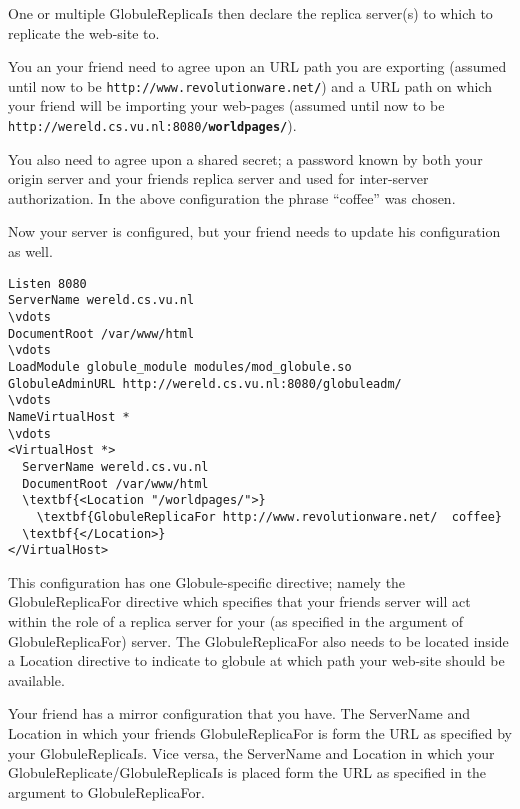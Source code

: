 \documentclass[10pt,a4paper]{article}
\makeatletter
\newenvironment{p}{\@open{P}{}}{\@close{P}}
\newenvironment{p}{}{\par}
\makeatother
\begin{document}
\begin{p}
One or multiple GlobuleReplicaIs then declare the replica server(s) to which
to replicate the web-site to.
\end{p}

\begin{p}
You an your friend need to agree upon an URL path you are exporting (assumed
until now to be \texttt{http://www.revolutionware.net\textbf{/}}) and a URL
path on which your friend will be importing your web-pages (assumed until now
to be \texttt{http://wereld.cs.vu.nl:8080/\textbf{worldpages/}}).
\end{p}

\begin{p}
You also need to agree upon a shared secret; a password known by both your
origin server and your friends replica server and used for inter-server
authorization.  In the above configuration the phrase ``coffee'' was chosen.
\end{p}

\begin{p}
Now your server is configured, but your friend needs to update his
configuration as well.
\end{p}

\begin{Verbatim}[label=Friend's replica server's configuration]
Listen 8080
ServerName wereld.cs.vu.nl
\vdots
DocumentRoot /var/www/html
\vdots
LoadModule globule_module modules/mod_globule.so
GlobuleAdminURL http://wereld.cs.vu.nl:8080/globuleadm/
\vdots
NameVirtualHost *
\vdots
<VirtualHost *>
  ServerName wereld.cs.vu.nl
  DocumentRoot /var/www/html
  \textbf{<Location "/worldpages/">}
    \textbf{GlobuleReplicaFor http://www.revolutionware.net/  coffee}
  \textbf{</Location>}
</VirtualHost>
\end{Verbatim}

\begin{p}
This configuration has one Globule-specific directive; namely the
GlobuleReplicaFor directive which specifies that your friends server will act
within the role of a replica server for your (as specified in the argument of
GlobuleReplicaFor) server.  The GlobuleReplicaFor also needs to be located
inside a Location directive to indicate to globule at which path your web-site
should be available.
\end{p}

\begin{p}
Your friend has a mirror configuration that you have.  The ServerName and
Location in which your friends GlobuleReplicaFor is form the URL as specified
by your GlobuleReplicaIs.  Vice versa, the ServerName and Location in which
your GlobuleReplicate/GlobuleReplicaIs is placed form the URL as specified in
the argument to GlobuleReplicaFor.
\end{p}
\end{document}
